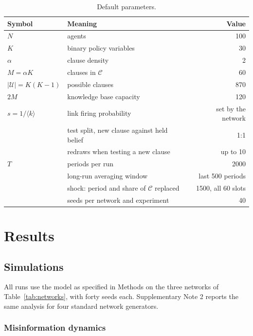 \documentclass[11pt]{article}
\begin{document}
\begin{table}[H]
\centering
\caption{Default parameters.}
\label{tab:params}
\small
\begin{tabular}{@{}llr@{}}
\toprule
Symbol & Meaning & Value \\
\midrule
$N$ & agents & 100 \\
$K$ & binary policy variables & 30 \\
$\alpha$ & clause density & 2 \\
$M = \alpha K$ & clauses in $\mathcal{C}$ & 60 \\
$|\mathcal{U}| = K(K-1)$ & possible clauses & 870 \\
$2M$ & knowledge base capacity & 120 \\
$s = 1/\langle k\rangle$ & link firing probability & set by the network \\
 & test split, new clause against held belief & 1:1 \\
 & redraws when testing a new clause & up to 10 \\
$T$ & periods per run & 2000 \\
 & long-run averaging window & last 500 periods \\
 & shock: period and share of $\mathcal{C}$ replaced & 1500, all 60 slots \\
 & seeds per network and experiment & 40 \\
\bottomrule
\end{tabular}
\end{table}


\section{Results}\label{sec:results}

\subsection{Simulations}

All runs use the model as specified in Methods on the three networks of Table~\ref{tab:networks}, with forty seeds each. Supplementary Note 2 reports the same analysis for four standard network generators.

\subsubsection{Misinformation dynamics}
\end{document}
